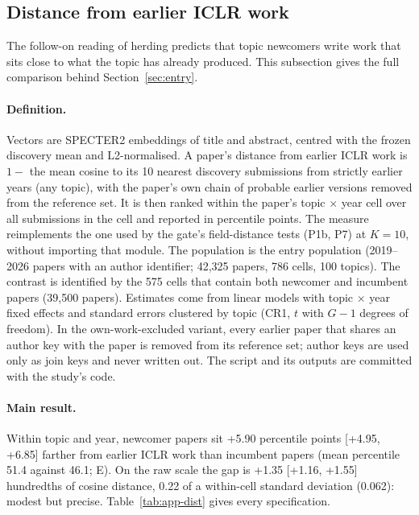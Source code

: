\subsection{Distance from earlier ICLR work}\label{app:distance}

The follow-on reading of herding predicts that topic newcomers write work that sits close to what the topic has
already produced. This subsection gives the full comparison behind Section~\ref{sec:entry}.

\paragraph{Definition.} Vectors are SPECTER2 embeddings of title and abstract, centred with the frozen discovery mean
and L2-normalised. A paper's distance from earlier ICLR work is $1-$ the mean cosine to its 10 nearest discovery
submissions from strictly earlier years (any topic), with the paper's own chain of probable earlier versions removed
from the reference set. It is then ranked within the paper's topic $\times$ year cell over all submissions in the cell
and reported in percentile points. The measure reimplements the one used by the gate's field-distance tests (P1b, P7)
at $K=10$, without importing that module. The population is the entry population (2019--2026 papers with an author
identifier; 42,325 papers, 786 cells, 100 topics). The contrast is identified by the 575 cells that contain both
newcomer and incumbent papers (39,500 papers). Estimates come from linear models with topic $\times$ year fixed
effects and standard errors clustered by topic (CR1, $t$ with $G-1$ degrees of freedom). In the own-work-excluded
variant, every earlier paper that shares an author key with the paper is removed from its reference set; author keys
are used only as join keys and never written out. The script and its outputs are committed with the study's code.

\paragraph{Main result.} Within topic and year, newcomer papers sit +5.90 percentile points [+4.95, +6.85] farther
from earlier ICLR work than incumbent papers (mean percentile 51.4 against 46.1; E). On the raw scale the gap is
+1.35 [+1.16, +1.55] hundredths of cosine distance, 0.22 of a within-cell standard deviation (0.062): modest but
precise. Table~\ref{tab:app-dist} gives every specification.

